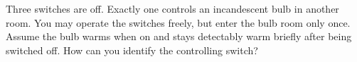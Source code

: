 Three switches are off. Exactly one controls an incandescent bulb in another room. You may operate the switches freely, but enter the bulb room only once. Assume the bulb warms when on and stays detectably warm briefly after being switched off. How can you identify the controlling switch?
